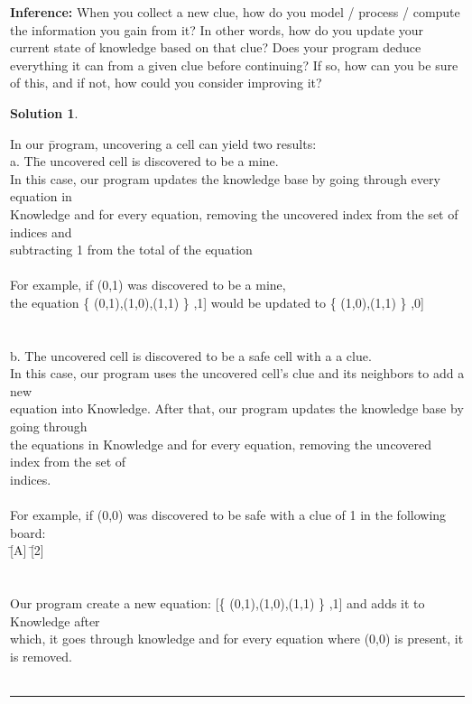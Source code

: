 \documentclass{article}
\theoremstyle{definition}
\def\fline{\rule{0.75\linewidth}{0.5pt}}
\newcommand{\finishline}{\vspace{-15pt}\begin{center}\fline\end{center}}
\newtheorem*{solution*}{Solution}
\newenvironment{solution}{\begin{solution*}}{{\finishline} \end{solution*}}
\begin{document}
\textbf{Inference:}
	When you collect a new clue, how do you model / process / compute the information you gain from it?
    In other words, how do you update your current state of knowledge based on that clue? 
    Does your program deduce everything it can from a given clue before continuing? If so, how can you be sure of this, and if not, how could you consider improving it? \\
\begin{solution} \hfill \\
    \begin{tabbing}
	In our \=program, uncovering a cell can yield two results: \\
	\>a. T\=he uncovered cell is discovered to be a mine.\\
	\>\>In this case, our program updates the knowledge base by going through every equation in\\ \>\>Knowledge and for every equation, removing the uncovered index from the set of indices and\\ \>\>subtracting 1 from the total of the equation\\\\
	
	\>\> For example, if (0,1) was discovered to be a mine, \\
	\>\>the equation \{ (0,1),(1,0),(1,1) \} ,1] would be updated to \{ (1,0),(1,1) \} ,0] \\\\\\
	
	\>b. The uncovered cell is discovered to be a safe cell with a a clue.\\
	\>\>In this case, our program uses the uncovered cell's clue and its neighbors to add a new\\ \>\>equation into Knowledge. After that, our program updates the knowledge base by going through\\
	\>\>the equations in Knowledge and for every equation, removing the uncovered index from the set of\\
	\>\>indices.\\\\
	
	\>\>For example, if (0,0) was discovered to be safe with a clue of 1 in the following board:\\
	\>\>[1] \=[A] \=[2] \\ 
    \>\>[B] \>[C] \>[D] \\
    \>\>[E] \>[3] \>[F] \\
    \>\>Our program create a new equation: [\{ (0,1),(1,0),(1,1) \} ,1] and adds it to Knowledge after \\ \>\>which, it goes through knowledge and for every equation where (0,0) is present, it is removed.\\\\
    

\end{tabbing}
\end{solution}
\end{document}
